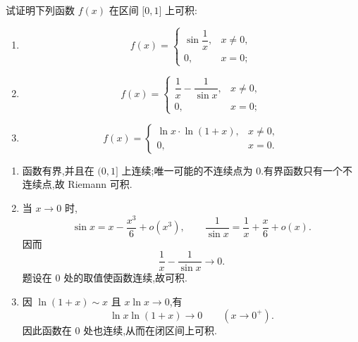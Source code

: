 \begin{example}
    试证明下列函数 $f(x)$ 在区间 $\lbrack 0,1\rbrack$ 上可积:
    \begin{enumerate}
        \item
              \[
                  f(x)=\begin{cases}
                      \sin\dfrac{1}{x}, & x\neq0, \\
                      0,                & x=0;
                  \end{cases}
              \]
        \item
              \[
                  f(x)=\begin{cases}
                      \dfrac{1}{x}-\dfrac{1}{\sin x}, & x\neq0, \\
                      0,                              & x=0;
                  \end{cases}
              \]
        \item
              \[
                  f(x)=\begin{cases}
                      \ln x\cdot\ln(1+x), & x\neq0, \\
                      0,                  & x=0.
                  \end{cases}
              \]
    \end{enumerate}
\end{example}
\exampleblank

\begin{solution}
    \leavevmode
    \begin{enumerate}
        \item 函数有界,并且在 $(0,1\rbrack$ 上连续;唯一可能的不连续点为 $0$.有界函数只有一个不连续点,故 Riemann 可积.

        \item 当 $x\to0$ 时,
              \[
                  \sin x=x-\dfrac{x^3}{6}+o(x^3),
                  \qquad
                  \dfrac{1}{\sin x}
                  =\dfrac{1}{x}+\dfrac{x}{6}+o(x).
              \]
              因而
              \[
                  \dfrac{1}{x}-\dfrac{1}{\sin x}\longrightarrow0.
              \]
              题设在 $0$ 处的取值使函数连续,故可积.

        \item 因 $\ln(1+x)\sim x$ 且 $x\ln x\to0$,有
              \[
                  \ln x\ln(1+x)\longrightarrow0
                  \qquad(x\to0^+).
              \]
              因此函数在 $0$ 处也连续,从而在闭区间上可积.
    \end{enumerate}
\end{solution}

